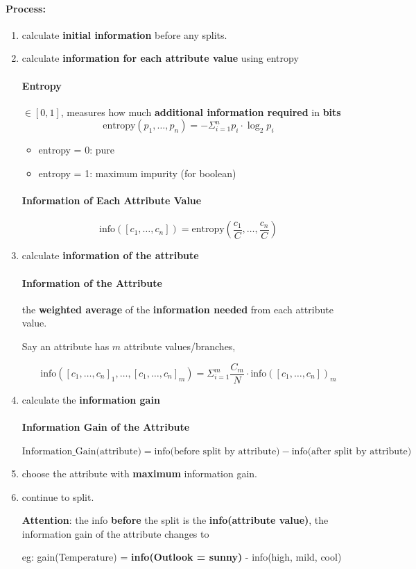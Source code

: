 \paragraph{Process: }
\begin{enumerate} [label= \protect \circled{\arabic*} ]
	\item calculate \textbf{initial information} before any splits.
	\item calculate \textbf{information for each attribute value} using entropy
	\paragraph{Entropy} $\in [0,1]$, measures how much \textbf{additional information required} in \textbf{bits}
	$$\text{entropy}(p_1, \dots, p_n) = - \Sigma_{i=1} ^n p_i \cdot \log_{2} p_i$$
	\begin{itemize}
		\item entropy = 0: pure
		\item entropy = 1: maximum impurity (for boolean)
	\end{itemize}
	\paragraph{Information of Each Attribute Value} 
	
	$$\text{info}([c_1, \dots, c_n]) = \text{entropy}(\frac{c_1}{C}, \dots, \frac{c_n}{C})$$ 
	\item calculate \textbf{information of the attribute} 
	\paragraph{Information of the Attribute} the \textbf{weighted average} of the \textbf{information needed} from each attribute value. 
	
	Say an attribute has $m$ attribute values/branches,
	
	$$\text{info}([c_1, \dots, c_n]_1, \dots, [c_1, \dots, c_n]_m) = \Sigma_{i=1}^m  \frac{C_m}{N} \cdot \text{info}([c_1, \dots, c_n])_m$$
	
	
	\item calculate the \textbf{information gain}	
	
	\paragraph{Information Gain of the Attribute} 
	
	$$\text{Information\_Gain(attribute)} = \text{info(before split by attribute)} - \text{info(after split by attribute)}$$ 
	
	\item choose the attribute with \textbf{maximum} information gain. 
	\item continue to split. 
	
	\textbf{Attention}: the info \textbf{before} the split is the \textbf{info(attribute value)}, the information gain of the attribute changes to 
	
	eg: gain(Temperature) = \textbf{info(Outlook = sunny)} - info(high, mild, cool)
\end{enumerate}

